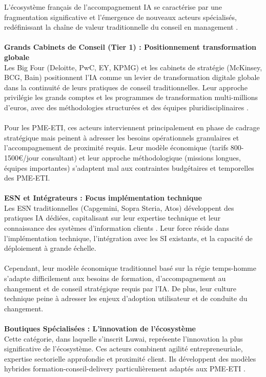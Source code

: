 L'écosystème français de l'accompagnement IA se caractérise par une fragmentation significative et l'émergence de nouveaux acteurs spécialisés, redéfinissant la chaîne de valeur traditionnelle du conseil en management \cite{syntec2024ai}.
\\\\
\textbf{Grands Cabinets de Conseil (Tier 1) : Positionnement transformation globale}\\
Les Big Four (Deloitte, PwC, EY, KPMG) et les cabinets de stratégie (McKinsey, BCG, Bain) positionnent l'IA comme un levier de transformation digitale globale dans la continuité de leurs pratiques de conseil traditionnelles. Leur approche privilégie les grands comptes et les programmes de transformation multi-millions d'euros, avec des méthodologies structurées et des équipes pluridisciplinaires \cite{mckinsey2024ai_transformation}.
\\\\
Pour les PME-ETI, ces acteurs interviennent principalement en phase de cadrage stratégique mais peinent à adresser les besoins opérationnels granulaires et l'accompagnement de proximité requis. Leur modèle économique (tarifs 800-1500€/jour consultant) et leur approche méthodologique (missions longues, équipes importantes) s'adaptent mal aux contraintes budgétaires et temporelles des PME-ETI.
\\\\
\textbf{ESN et Intégrateurs : Focus implémentation technique}\\
Les ESN traditionnelles (Capgemini, Sopra Steria, Atos) développent des pratiques IA dédiées, capitalisant sur leur expertise technique et leur connaissance des systèmes d'information clients \cite{syntec2024digital}. Leur force réside dans l'implémentation technique, l'intégration avec les SI existants, et la capacité de déploiement à grande échelle.
\\\\
Cependant, leur modèle économique traditionnel basé sur la régie temps-homme s'adapte difficilement aux besoins de formation, d'accompagnement au changement et de conseil stratégique requis par l'IA. De plus, leur culture technique peine à adresser les enjeux d'adoption utilisateur et de conduite du changement.
\\\\
\textbf{Boutiques Spécialisées : L'innovation de l'écosystème}\\
Cette catégorie, dans laquelle s'inscrit Luwai, représente l'innovation la plus significative de l'écosystème. Ces acteurs combinent agilité entrepreneuriale, expertise sectorielle approfondie et proximité client. Ils développent des modèles hybrides formation-conseil-delivery particulièrement adaptés aux PME-ETI \cite{luwai2025meetings}.
